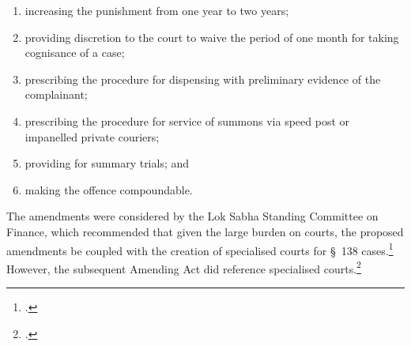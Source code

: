 \begin{enumerate}[label=(\alph*)]
 \item increasing the punishment from one year to two years;
 \item providing discretion to the court to waive the period of one month for taking cognisance of a case;
 \item prescribing the procedure for dispensing with preliminary evidence of the complainant;
 \item prescribing the procedure for service of summons via speed post or impanelled private couriers;
 \item providing for summary trials; and
 \item making the offence compoundable.
\end{enumerate}

The amendments were considered by the Lok Sabha Standing Committee on Finance, which recommended that given the large burden on courts, the proposed amendments be coupled with the creation of specialised courts for \S~138 cases.\footcite{stdcomm2001_138niAct} However, the subsequent Amending Act did reference specialised courts.\footcite{niAmend2002}


